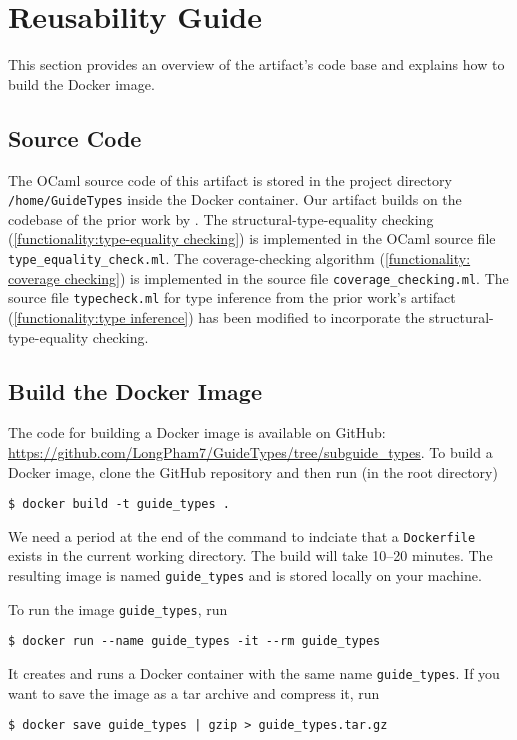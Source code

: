 
\section{Reusability Guide}

This section provides an overview of the artifact's code base and explains how
to build the Docker image.

\subsection{Source Code}
\label{sec:Source Code}

The OCaml source code of this artifact is stored in the project directory
\texttt{/home/GuideTypes} inside the Docker container.
%
Our artifact builds on the codebase of the prior work by
\citeauthor{PLDI:WHR21B}.
%
The structural-type-equality checking (\ref{functionality:type-equality
checking}) is implemented in the OCaml source file
\texttt{type\_equality\_check.ml}.
%
The coverage-checking algorithm (\ref{functionality: coverage checking}) is
implemented in the source file \texttt{coverage\_checking.ml}.
%
The source file \texttt{typecheck.ml} for type inference from the prior work's
artifact (\ref{functionality:type inference}) has been modified to incorporate
the structural-type-equality checking.

\subsection{Build the Docker Image}
\label{sec:Build the Docker Image}

The code for building a Docker image is available on GitHub:
\url{https://github.com/LongPham7/GuideTypes/tree/subguide_types}.
%
To build a Docker image, clone the GitHub repository and then run (in the root
directory)
\begin{verbatim}
$ docker build -t guide_types .
\end{verbatim}
%
We need a period at the end of the command to indciate that a
\texttt{Dockerfile} exists in the current working directory.
%
The build will take 10--20 minutes.
%
The resulting image is named \texttt{guide\_types} and is stored locally on your
machine.

To run the image \texttt{guide\_types}, run
\begin{verbatim}
$ docker run --name guide_types -it --rm guide_types
\end{verbatim}
%
It creates and runs a Docker container with the same name \texttt{guide\_types}.
%
If you want to save the image as a tar archive and compress it, run
\begin{verbatim}
$ docker save guide_types | gzip > guide_types.tar.gz
\end{verbatim}
